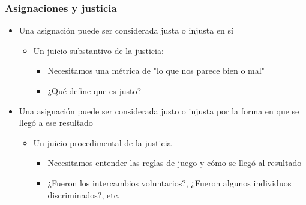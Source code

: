 \documentclass{beamer}
\begin{document}
\begin{frame}
\frametitle{Asignaciones y justicia}
\begin{itemize}
    \item Una asignación puede ser considerada justa o injusta en sí
    \begin{itemize}
        \item Un juicio substantivo de la justicia:
        \begin{itemize}
            \item Necesitamos una métrica de "lo que nos parece bien o mal"
            \item ¿Qué define que es justo?
        \end{itemize}
    \end{itemize}
    \item  Una asignación puede ser considerada justo o  injusta por la forma en que se llegó a ese resultado
    \begin{itemize}
        \item Un juicio procedimental de la justicia
        \begin{itemize} 
            \item Necesitamos entender las reglas de juego y cómo se llegó al resultado \\
            \item ¿Fueron los intercambios voluntarios?, ¿Fueron algunos individuos discriminados?, etc.
        \end{itemize}
    \end{itemize}
\end{itemize}
\end{frame}
\end{document}
